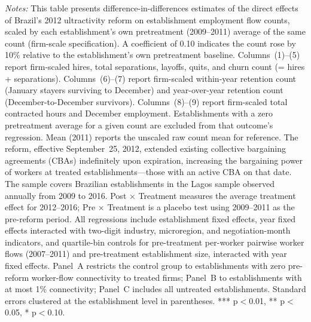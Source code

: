 \documentclass[12pt,letterpaper]{article}
\begin{document}
\begin{table}[]
\begin{threeparttable}
\begin{tablenotes}
\item \textit{Notes:} This table presents difference-in-differences estimates of the direct effects of Brazil's 2012 ultractivity reform on establishment employment flow counts, scaled by each establishment's own pretreatment (2009--2011) average of the same count (firm-scale specification). A coefficient of 0.10 indicates the count rose by 10\% relative to the establishment's own pretreatment baseline. Columns~(1)--(5) report firm-scaled hires, total separations, layoffs, quits, and churn count (= hires + separations). Columns~(6)--(7) report firm-scaled within-year retention count (January stayers surviving to December) and year-over-year retention count (December-to-December survivors). Columns~(8)--(9) report firm-scaled total contracted hours and December employment. Establishments with a zero pretreatment average for a given count are excluded from that outcome's regression. Mean (2011) reports the unscaled raw count mean for reference. The reform, effective September~25, 2012, extended existing collective bargaining agreements (CBAs) indefinitely upon expiration, increasing the bargaining power of workers at treated establishments---those with an active CBA on that date. The sample covers Brazilian establishments in the Lagos sample observed annually from 2009 to 2016. Post $\times$ Treatment measures the average treatment effect for 2012--2016; Pre $\times$ Treatment is a placebo test using 2009--2011 as the pre-reform period. All regressions include establishment fixed effects, year fixed effects interacted with two-digit industry, microregion, and negotiation-month indicators, and quartile-bin controls for pre-treatment per-worker pairwise worker flows (2007--2011) and pre-treatment establishment size, interacted with year fixed effects. Panel~A restricts the control group to establishments with zero pre-reform worker-flow connectivity to treated firms; Panel~B to establishments with at most 1\% connectivity; Panel~C includes all untreated establishments. Standard errors clustered at the establishment level in parentheses. *** p$<$0.01, ** p$<$0.05, * p$<$0.10.
\end{tablenotes}
\end{threeparttable}
\end{table}

\clearpage
\end{document}
